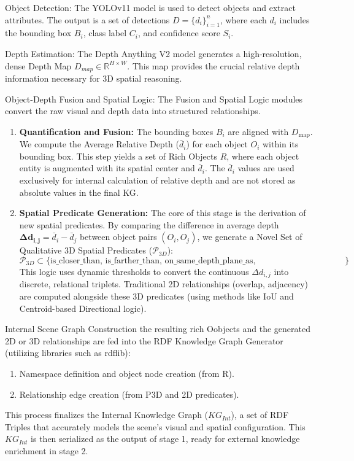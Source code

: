 \documentclass[runningheads,14pt]{llncs}
\begin{document}
Object Detection: The YOLOv11 model is used to detect objects and extract attributes. The output is a set of detections $D = \{d_i\}_{i=1}^n$, where each $d_i$ includes the bounding box $B_i$, class label $C_i$, and confidence score $S_i$.

Depth Estimation: The Depth Anything V2 model generates a high-resolution, dense Depth Map $D_{map} \in \mathbb{R}^{H \times W}$. This map provides the crucial relative depth information necessary for 3D spatial reasoning.


Object-Depth Fusion and Spatial Logic: The Fusion and Spatial Logic modules convert the raw visual and depth data into structured relationships.
\begin{enumerate}[leftmargin=3em]
    \item \textbf{Quantification and Fusion:} The bounding boxes $B_i$ are aligned with $D_{\text{map}}$. We compute the Average Relative Depth ($\bar{d}_i$) for each object $O_i$ within its bounding box. This step yields a set of Rich Objects $R$, where each object entity is augmented with its spatial center and $\bar{d}_i$. The $\bar{d}_i$ values are used exclusively for internal calculation of relative depth and are not stored as absolute values in the final KG.
    \item \textbf{Spatial Predicate Generation:} The core of this stage is the derivation of new spatial predicates. By comparing the difference in average depth $\mathbf{\Delta d_{i,j}} = \bar{d}_i - \bar{d}_j$ between object pairs $(O_i, O_j)$, we generate a Novel Set of Qualitative 3D Spatial Predicates ($\mathcal{P}_{3D}$):
    $$\mathcal{P}_{3D} \subset \{\text{is\_closer\_than, is\_farther\_than, on\_same\_depth\_plane\_as, in\_immediate\_foreground, etc.}\}$$
    This logic uses dynamic thresholds to convert the continuous $\Delta d_{i,j}$ into discrete, relational triplets. Traditional 2D relationships (overlap, adjacency) are computed alongside these 3D predicates (using methods like IoU and Centroid-based Directional logic).
\end{enumerate}

Internal Scene Graph Construction the resulting rich Oobjects and the generated 2D or 3D relationships are fed into the RDF Knowledge Graph Generator (utilizing libraries such as rdflib):
\begin{enumerate}[leftmargin=3em]
    \item Namespace definition and object node creation (from R).
    \item Relationship edge creation (from P3D and 2D predicates).
\end{enumerate}
This process finalizes the Internal Knowledge Graph ($KG_{Int}$), a set of RDF Triples that accurately models the scene’s visual and spatial configuration. This $KG_{Int}$ is then serialized as the output of stage 1, ready for external knowledge enrichment in stage 2.
\end{document}
